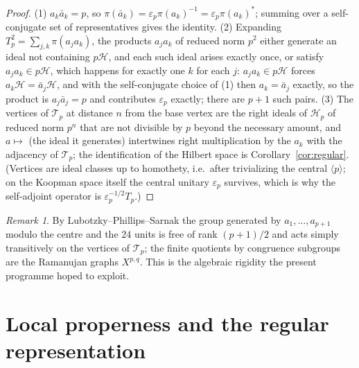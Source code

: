 \documentclass[11pt]{amsart}
\numberwithin{equation}{section}
\theoremstyle{definition}
\theoremstyle{remark}
\newtheorem{remark}[theorem]{Remark}
\newcommand{\cH}{\mathcal{H}}
\newcommand{\cT}{\mathcal{T}}
\begin{document}
\begin{proof}
(1) $a_k\bar a_k=p$, so $\pi(\bar a_k)=\varepsilon_p\pi(a_k)^{-1}=\varepsilon_p\pi(a_k)^*$;
summing over a self-conjugate set of representatives gives the identity. (2) Expanding
$T_p^2=\sum_{j,k}\pi(a_ja_k)$, the products $a_ja_k$ of reduced norm $p^2$ either generate an ideal
not containing $p\cH$, and each such ideal arises exactly once, or satisfy $a_ja_k\in p\cH$, which
happens for exactly one $k$ for each $j$: $a_ja_k\in p\cH$ forces $a_k\cH=\bar a_j\cH$, and
with the self-conjugate choice of (1) then $a_k=\bar a_j$ exactly, so the product is
$a_j\bar a_j=p$ and contributes $\varepsilon_p$ exactly; there are $p+1$ such pairs. (3) The vertices of $\cT_p$ at distance $n$ from the base vertex are
the right ideals of $\cH_p$ of reduced norm $p^n$ that are not divisible by $p$ beyond the
necessary amount, and $a\mapsto$ (the ideal it generates) intertwines right multiplication by the
$a_k$ with the adjacency of $\cT_p$; the identification of the Hilbert space is
Corollary~\ref{cor:regular}. (Vertices are ideal classes up to homothety, i.e.\ after
trivializing the central $\langle p\rangle$; on the Koopman space itself the central unitary
$\varepsilon_p$ survives, which is why the self-adjoint operator is
$\varepsilon_p^{-1/2}T_p$.)
\end{proof}

\begin{remark}
By Lubotzky--Phillips--Sarnak the group generated by $a_1,\dots,a_{p+1}$ modulo the centre and the
$24$ units is free of rank $(p+1)/2$ and acts simply transitively on the vertices of $\cT_p$; the
finite quotients by congruence subgroups are the Ramanujan graphs $X^{p,q}$. This is the algebraic
rigidity the present programme hoped to exploit.
\end{remark}

\section{Local properness and the regular representation}\label{sec:proper}
\end{document}
